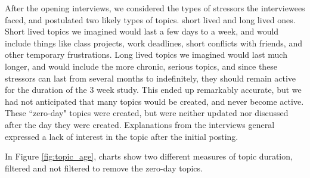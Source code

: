  After the opening interviews, we considered the types of stressors the
  interviewees faced, and postulated two likely types of topics.
  short lived and long lived ones.
  Short lived topics we imagined would last a few days to a week,
  and would include things like class projects,
  work deadlines, short conflicts with friends, and other temporary frustrations.
  Long lived topics we imagined would last much longer,
  and would include the more chronic, serious topics,
  and since these stressors can last from several months to indefinitely,
  they should remain active for the duration of the 3 week study.
  This ended up remarkably accurate,
  but we had not anticipated that many topics would be created,
  and never become active.
  These ``zero-day" topics were created,
  but were neither updated nor discussed after the day they were created.
  Explanations from the interviews general expressed a lack of interest
  in the topic after the initial posting.

  In Figure \ref{fig:topic_age}, charts show two different measures of 
  topic duration, filtered and not filtered to remove the zero-day topics.

